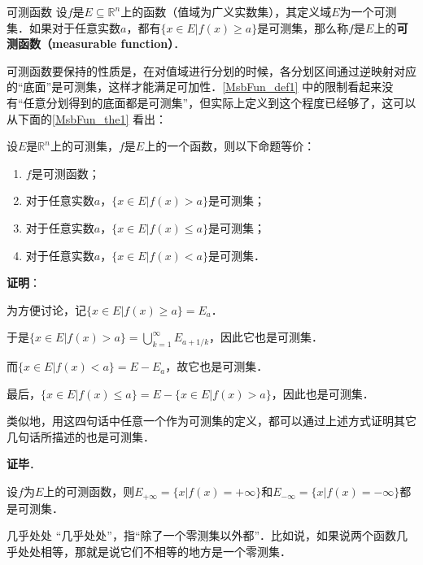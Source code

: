 \begin{definition}{可测函数}\label{MsbFun_def1}
设$f$是$E\subseteq\mathbb{R}^n$上的函数（值域为广义实数集），其定义域$E$为一个可测集．如果对于任意实数$a$，都有$\{x\in E|f(x)\geq a\}$是可测集，那么称$f$是$E$上的\textbf{可测函数（measurable function）}．
\end{definition}


可测函数要保持的性质是，在对值域进行分划的时候，各分划区间通过逆映射对应的“底面”是可测集，这样才能满足可加性．\autoref{MsbFun_def1} 中的限制看起来没有“任意分划得到的底面都是可测集”，但实际上定义到这个程度已经够了，这可以从下面的\autoref{MsbFun_the1} 看出：


\begin{theorem}{}\label{MsbFun_the1}
设$E$是$\mathbb{R}^n$上的可测集，$f$是$E$上的一个函数，则以下命题等价：
\begin{enumerate}
\item $f$是可测函数；
\item 对于任意实数$a$，$\{x\in E|f(x)>a\}$是可测集；
\item 对于任意实数$a$，$\{x\in E|f(x)\leq a\}$是可测集；
\item 对于任意实数$a$，$\{x\in E|f(x)<a\}$是可测集．
\end{enumerate}
\end{theorem}

\textbf{证明}：

为方便讨论，记$\{x\in E|f(x)\geq a\}=E_a$．

于是$\{x\in E|f(x)>a\}=\bigcup_{k=1}^\infty E_{a+1/k}$，因此它也是可测集．

而$\{x\in E|f(x)<a\}=E-E_a$，故它也是可测集．

最后，$\{x\in E|f(x)\leq a\}=E-\{x\in E|f(x)>a\}$，因此也是可测集．

类似地，用这四句话中任意一个作为可测集的定义，都可以通过上述方式证明其它几句话所描述的也是可测集．

\textbf{证毕}．





\begin{corollary}{}
设$f$为$E$上的可测函数，则$E_{+\infty}=\{x|f(x)=+\infty\}$和$E_{-\infty}=\{x|f(x)=-\infty\}$都是可测集．
\end{corollary}



\begin{definition}{几乎处处}
“几乎处处”，指“除了一个零测集以外都”．比如说，如果说两个函数几乎处处相等，那就是说它们不相等的地方是一个零测集．
\end{definition}

